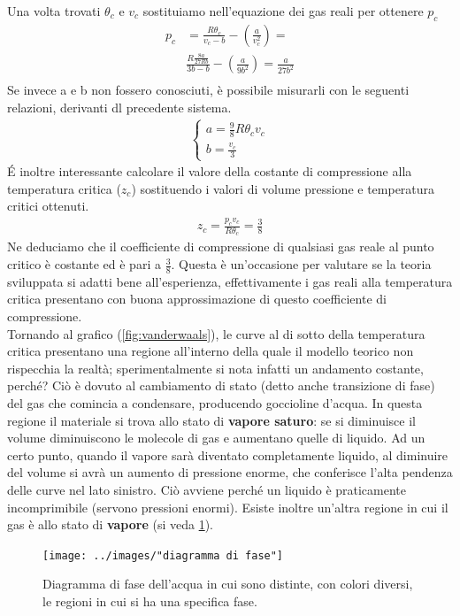 \documentclass[10pt,a4paper]{article}
\begin{document}
Una volta trovati $\theta_c$ e $v_c$ sostituiamo nell'equazione dei gas reali per ottenere $p_c$
\begin{align*} 
	p_c &= \frac{R \theta_c}{v_c - b}-  \left(\frac{a}{v_c^2}\right) = \\
	&\frac{R \frac{8a}{27 R b}}{3b - b}-  \left(\frac{a}{9b^2}\right) = \frac{a}{27 b^2}\\
\end{align*} 
Se invece a e b non fossero conosciuti, è possibile misurarli con le seguenti relazioni, derivanti dl precedente sistema. 
\begin{align*} 
\begin{cases}
a = \frac{9}{8} R \theta_c v_c\\
b = \frac{v_c}{3}
\end{cases}
\end{align*} 
\'{E} inoltre interessante calcolare il valore della costante di compressione alla temperatura critica ($z_c$) sostituendo i valori di volume pressione e temperatura critici ottenuti. 
\begin{align*} 
z_c = \frac{p_c v_c }{R \theta_c} = \frac{3}{8}
\end{align*} 
Ne deduciamo che il coefficiente di compressione di qualsiasi gas reale al punto critico è costante ed è pari a $\frac{3}{8}$. Questa è un'occasione per valutare se la teoria sviluppata si adatti bene all'esperienza, effettivamente i gas reali alla temperatura critica presentano con buona approssimazione di questo coefficiente di compressione.\\
Tornando al grafico (\ref{fig:vanderwaals}), le curve al di sotto della temperatura critica presentano una regione all'interno della quale il modello teorico non rispecchia la realtà; sperimentalmente si nota infatti un andamento costante, perché? Ciò è dovuto al cambiamento di stato (detto anche transizione di fase) del gas che comincia a condensare, producendo goccioline d'acqua. In questa regione il materiale si trova allo stato di \textbf{vapore saturo}: se si diminuisce il volume diminuiscono le molecole di gas e aumentano quelle di liquido. Ad un certo punto, quando il vapore sarà diventato completamente liquido, al diminuire del volume si avrà un aumento di pressione enorme, che conferisce l'alta pendenza delle curve nel lato sinistro. Ciò avviene perché un liquido è praticamente incomprimibile (servono pressioni enormi). Esiste inoltre un'altra regione in cui il gas è allo stato di \textbf{vapore} (si veda \ref{fig:diagramma-di-fase}). 
\begin{figure}[h!]
	\centering
	\texttt{[image: ../images/"diagramma di fase"]}
	\caption{Diagramma di fase dell'acqua in cui sono distinte, con colori diversi, le regioni in cui si ha una specifica fase.}
	\label{fig:diagramma-di-fase}
\end{figure}
\end{document}
